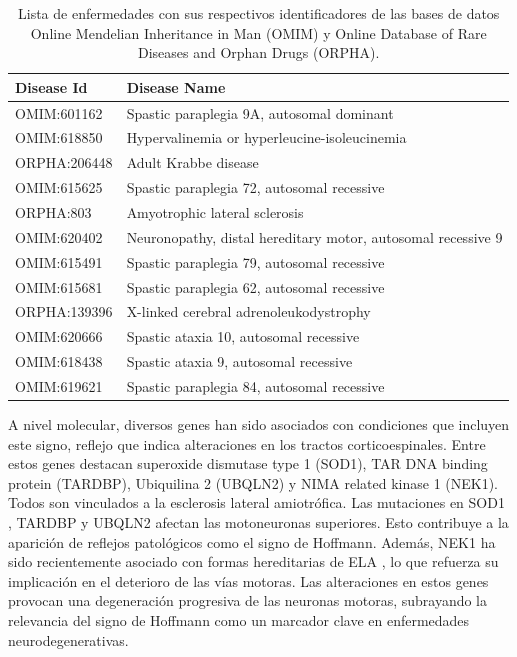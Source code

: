 \begin{table}[h!]
	\centering
	\caption{Lista de enfermedades con sus respectivos identificadores de las bases de datos Online Mendelian Inheritance in Man (OMIM)\cite{omim} y Online Database of Rare Diseases and Orphan Drugs (ORPHA)\cite{orphanet}.}
	\setlength{\extrarowheight}{2pt}
	\begin{tabular}{|>{\centering\arraybackslash}m{3cm}|>{\raggedright\arraybackslash}m{8.5cm}|}
		\hline
		\textbf{Disease Id}  & \textbf{Disease Name} \\ \hline
		OMIM:601162          & Spastic paraplegia 9A, autosomal dominant \\ \hline
		OMIM:618850          & Hypervalinemia or hyperleucine-isoleucinemia \\ \hline
		ORPHA:206448         & Adult Krabbe disease \\ \hline
		OMIM:615625          & Spastic paraplegia 72, autosomal recessive \\ \hline
		ORPHA:803            & Amyotrophic lateral sclerosis \\ \hline
		OMIM:620402          & Neuronopathy, distal hereditary motor, autosomal recessive 9 \\ \hline
		OMIM:615491          & Spastic paraplegia 79, autosomal recessive \\ \hline
		OMIM:615681          & Spastic paraplegia 62, autosomal recessive \\ \hline
		ORPHA:139396         & X-linked cerebral adrenoleukodystrophy \\ \hline
		OMIM:620666          & Spastic ataxia 10, autosomal recessive \\ \hline
		OMIM:618438          & Spastic ataxia 9, autosomal recessive \\ \hline
		OMIM:619621          & Spastic paraplegia 84, autosomal recessive \\ \hline
	\end{tabular}
	\label{tab:disease_list}
\end{table}

A nivel molecular, diversos genes han sido asociados con condiciones que incluyen este signo, reflejo que indica alteraciones en los tractos corticoespinales. Entre estos genes destacan superoxide dismutase type 1 (SOD1), TAR DNA binding protein (TARDBP),  Ubiquilina 2 (UBQLN2) y NIMA related kinase 1 (NEK1). Todos son vinculados a la esclerosis lateral amiotrófica. Las mutaciones en SOD1 \cite{zhao2022g41d}, TARDBP \cite{sanchez2022atypical} y UBQLN2 \cite{teyssou:hal-03001781} afectan las motoneuronas superiores. Esto contribuye a la aparición de reflejos patológicos como el signo de Hoffmann. Además, NEK1 ha sido recientemente asociado con formas hereditarias de ELA \cite{mann2023NEK1}, lo que refuerza su implicación en el deterioro de las vías motoras. Las alteraciones en estos genes provocan una degeneración progresiva de las neuronas motoras, subrayando la relevancia del signo de Hoffmann como un marcador clave en enfermedades neurodegenerativas.
\\

